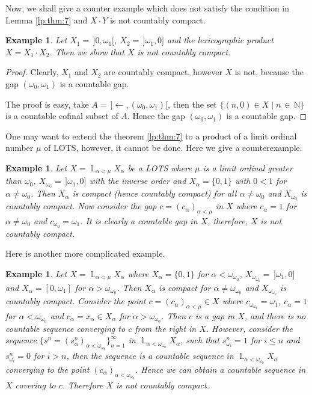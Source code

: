\documentclass[12pt,oneside,english]{amsbook}
\numberwithin{equation}{section} %
\numberwithin{figure}{section} %
\theoremstyle{plain}
\numberwithin{section}{chapter}
\theoremstyle{plain}
\newtheorem{eg}[thm]{Example}
\DeclareMathOperator{\LP}{\mathbb{L}}
\begin{document}
Now, we shall give a counter example which does not satisfy the condition in Lemma \ref{lp:thm:7} and $X \cdot Y$ is not countably compact.
\begin{eg}
  Let $X_{1}  = \, ] 0, \omega_{1} [$, $X_{2}  = \, ] \omega_{1}, 0 ]$ and the lexicographic product $X  =  X_{1} \cdot X_{2}$. Then we show that $X$ is not countably compact.
\end{eg}
\begin{proof}
  Clearly, $X_{1}$ and $X_{2}$ are countably compact, however $X$ is not, because the gap $(\omega_{0}, \omega_{1})$ is a countable gap.

  The proof is easy, take $A  = \, ] \leftarrow, (\omega_{0}, \omega_{1}) [$, then the set $\{(n,0)  \in  X \; | \; n \, \in \, \mathbb{N} \}$ is a countable cofinal subset of $A$. Hence the gap  $(\omega_{0}, \omega_{1})$ is a countable gap.
  
\end{proof}

One may want to extend the theorem \ref{lp:thm:7} to a product of a limit ordinal number $\mu$ of LOTS, however, it cannot be done. Here we give a counterexample.
\begin{eg}
  Let $X = \LP_{\alpha < \mu}X_{\alpha}$ be a LOTS where $\mu$ is a limit ordinal greater than $\omega_0$, $X_{\omega_0} = \, ]\omega_1,0]$ with the inverse order and $X_{\alpha} = \{0,1\}$ with $0 < 1$ for $\alpha \neq \omega_0$. Then $X_{\alpha}$ is compact (hence countably compact) for all $\alpha \neq \omega_0$ and $X_{\omega_0}$ is countably compact. Now consider the gap $c = (c_{\alpha})_{\alpha < \mu}$ in $X$ where $c_{\alpha} = 1$ for $\alpha \neq \omega_0$ and $c_{\omega_0} = \omega_1$. It is clearly a countable gap in $X$, therefore, $X$ is not countably compact.  
\end{eg}

Here is another more complicated example. 
\begin{eg}
 Let $X = \LP_{\alpha < \mu} X_{\alpha}$ where $X_{\alpha} = \{0,1\}$ for $\alpha < \omega_{\omega_{0}}$, $X_{\omega_{\omega_{0}}} = \, ]\omega_{1}, 0]$ and $X_{\alpha} = [0, \omega_{1}]$ for $\alpha > \omega_{\omega_{0}}$. Then $X_{\alpha}$ is compact for $\alpha \neq \omega_{\omega_{0}}$ and $X_{\omega_{\omega_{0}}}$ is countably compact. Consider the point $c = (c_{\alpha})_{\alpha < \mu} \in X$ where $c_{\omega_{\omega_{0}}} = \omega_{1}$, $c_{\alpha} = 1$ for $\alpha < \omega_{\omega_{0}}$ and $c_{\alpha} = x_{\alpha} \in X_{\alpha}$ for $\alpha > \omega_{\omega_{0}}$. Then $c$ is a gap in $X$, and there is no countable sequence converging to $c$ from the right in $X$. However, consider the sequence $\{s^{n} = (s^{n}_{\alpha})_{\alpha < \omega_{\omega_0}} \}_{n = 1}^{\infty}$ in  $\LP_{\alpha < \omega_{\omega_0}} X_{\alpha}$, such that $s_{\omega_i}^{n} = 1$ for $i \leq n$ and $s_{\omega_i}^{n} = 0$ for $i > n$, then the sequence is a countable sequence in $\LP_{\alpha < \omega_{\omega_0}} X_{\alpha}$ converging to the point $(c_{\alpha})_{\alpha < \omega_{\omega_0}}$. Hence we can obtain a countable sequence in $X$ covering to $c$. Therefore $X$ is not countably compact. 
\end{eg}

\nocite{*}


\end{document}
